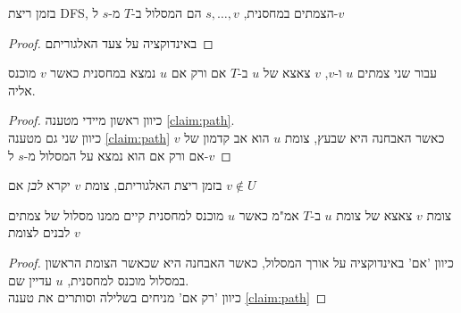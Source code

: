 \begin{claim}
\label{claim:path}
בזמן ריצת DFS, הצמתים במחסנית, 
$s,\ldots,v$
הם המסלול ב-$T$ מ-$s$ ל-$v$
\end{claim}
\begin{proof}
באינדוקציה על צעד האלגוריתם
\end{proof}
\begin{corollary}
עבור שני צמתים $u$ ו-$v$, $v$ צאצא של $u$ ב-$T$ אם ורק אם $u$ נמצא במחסנית כאשר $v$ מוכנס 
אליה.
\end{corollary}
\begin{proof}
כיוון ראשון מיידי מטענה
\ref{claim:path}.
\\
כיוון שני גם מטענה 
\ref{claim:path}
כאשר האבחנה היא שבעץ, צומת $u$ הוא אב קדמון של $v$ אם ורק אם הוא נמצא על המסלול מ-$s$
ל-$v$
\end{proof}

\begin{definition}
בזמן ריצת האלגוריתם, צומת $v$ יקרא 
\emph{לבן}
אם
$v \notin U$
\end{definition}

\begin{lemma}
צומת $v$ צאצא של צומת $u$ ב-$T$ אמ"מ כאשר $u$ 
מוכנס למחסנית קיים ממנו מסלול של צמתים לבנים לצומת $v$
\end{lemma}
\begin{proof}
כיוון 'אם' באינדוקציה על אורך המסלול, 
כאשר האבחנה היא שכאשר הצומת הראשון במסלול מוכנס למחסנית, $u$ עדיין שם.
\\
כיוון 'רק אם' מניחים בשלילה וסותרים את טענה
\ref{claim:path}
\end{proof}
